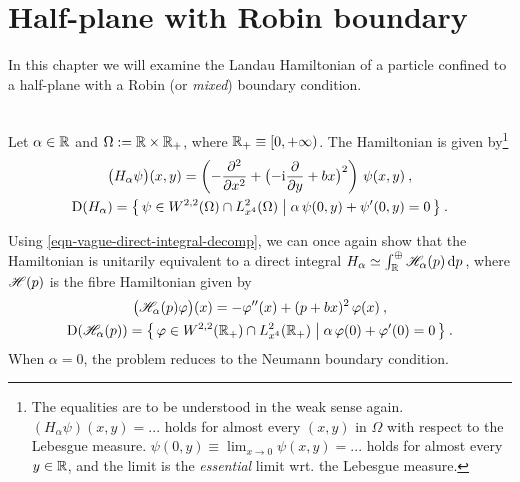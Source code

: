 \chapter{Half-plane with Robin boundary} \label{chapter-robin}
In this chapter we will examine the Landau Hamiltonian of a particle confined to a half-plane with a Robin (or \textit{mixed}) boundary condition.
\begin{defn}
    \label{defn-hamiltonian-robin}
    \\
    Let $\alpha \in \mathbb{R}$ and $\Omega := \mathbb{R} \times \mathbb{R}_+$, where $\mathbb{R}_+ \equiv [0, +\infty)$. The Hamiltonian is given by\footnote{
    The equalities are to be understood in the weak sense again. $(H_\alpha \psi)(x, y) = ...$ holds for almost every $(x,y)$ in $\Omega$ with respect to the Lebesgue measure. $\psi(0,y) \equiv \lim_{x \to 0} \psi(x,y) = ...$ holds for almost every $y\in\mathbb{R}$, and the limit is the \textit{essential} limit wrt. the Lebesgue measure.
}
\begin{equation}
    \begin{gathered}
        \big( H_\alpha \psi \big)(x,y)
        = \left(
            -\frac{\partial ^2}{\partial x^2} +
            \big( {-\mathrm{i}} \frac{\partial }{\partial y} + bx \big)^2
        \right) \, \psi(x,y) \: ,
        \\
        \mathrm{D}(H_\alpha)
        = \big\{ \,
            \psi \in W^{2,2}(\Omega) \cap L^2_{x^4}(\Omega)
            \; \big| \;
            \alpha \, \psi(0,y) + \psi'(0,y) = 0
        \, \big\} \: .
    \end{gathered}
\end{equation}
\end{defn}
Using \eqref{eqn-vague-direct-integral-decomp}, we can once again show that the Hamiltonian is unitarily equivalent to a direct integral $H_\alpha \simeq \int^\oplus_{\mathbb{R}} \mathscr{H}_\alpha(p) \, \mathrm{d}p \,$, where $\mathscr{H}(p)$ is the fibre Hamiltonian given by
\begin{equation}
    \begin{gathered}
        \big( \mathscr{H}_\alpha(p) \varphi \big)(x)
        = -\varphi''(x) + (p + bx)^2 \, \varphi(x) \: ,
        \\
        \mathrm{D}( \mathscr{H}_\alpha(p) )
        = \big\{ \,
            \varphi \in W^{2,2}(\mathbb{R}_+) \cap L^2_{x^4}(\mathbb{R}_+)
            \; \big| \;
            \alpha \, \varphi(0) + \varphi'(0) = 0
        \, \big\} \: .
    \end{gathered}
\end{equation}
When $\alpha=0$, the problem reduces to the Neumann boundary condition.

